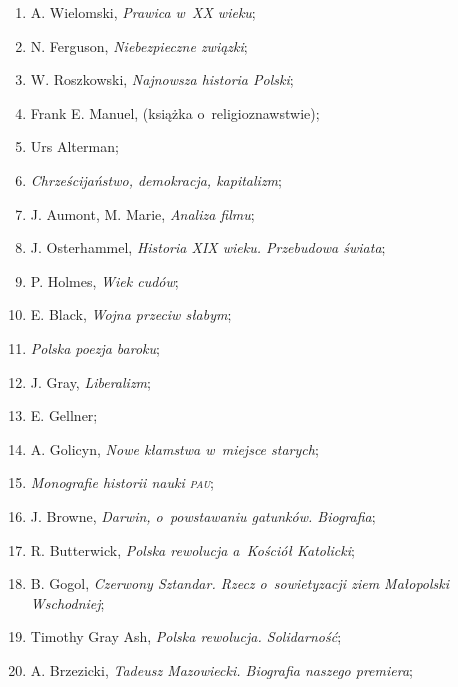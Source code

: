 \documentclass[a4paper,11pt]{article}
\begin{document}
\begin{enumerate}
\item A. Wielomski, \emph{Prawica w~XX wieku};

\item N. Ferguson, \emph{Niebezpieczne związki};

\item W. Roszkowski, \emph{Najnowsza historia Polski};

\item Frank E. Manuel, (książka o~religioznawstwie);

\item Urs Alterman;

\item \emph{Chrześcijaństwo, demokracja, kapitalizm};

\item J. Aumont, M. Marie, \emph{Analiza filmu};

\item J. Osterhammel, \emph{Historia XIX wieku. Przebudowa świata};

\item P. Holmes, \emph{Wiek cudów};

\item E. Black, \emph{Wojna przeciw słabym};

\item \emph{Polska poezja baroku};

\item J. Gray, \emph{Liberalizm};

\item E. Gellner;

\item A. Golicyn, \emph{Nowe kłamstwa w~miejsce starych};

\item \emph{Monografie historii nauki \textsc{pau}};

\item J. Browne, \emph{Darwin, o~powstawaniu gatunków. Biografia};

\item R. Butterwick, \emph{Polska rewolucja a~Kościół Katolicki};

\item B. Gogol, \emph{Czerwony Sztandar. Rzecz o~sowietyzacji ziem
    Małopolski Wschodniej};

\item Timothy Gray Ash, \emph{Polska rewolucja. Solidarność};

\item A. Brzezicki, \emph{Tadeusz Mazowiecki. Biografia naszego
    premiera};


\end{enumerate}
\end{document}
